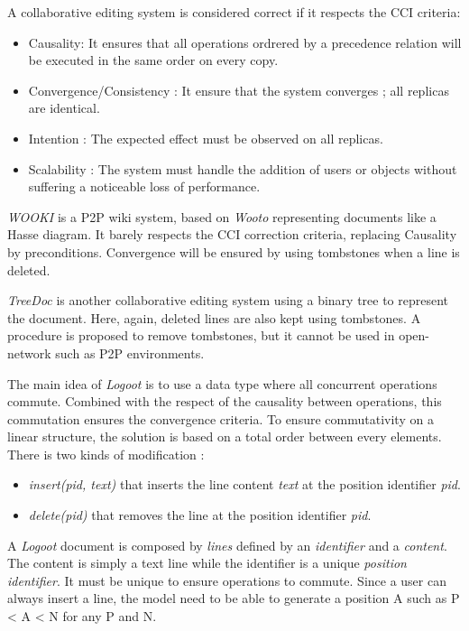 \documentclass[11pt, a4paper]{article}
\begin{document}
 A collaborative editing system is considered correct if it respects the CCI criteria:
 \begin{itemize}
  \item Causality: It ensures that all operations ordrered by a precedence relation will be executed in the same order on every copy.
  \item Convergence/Consistency : It ensure that the system converges ; all replicas are identical.
  \item Intention : The expected effect must be observed on all replicas.
  \item Scalability : The system must handle the addition of users or objects without suffering a noticeable loss of performance.
 \end{itemize}

 \emph{WOOKI} is a P2P wiki system, based on \emph{Wooto} representing documents like a Hasse diagram. It barely respects the CCI correction criteria, replacing Causality by preconditions. Convergence will be ensured by using tombstones when a line is deleted.

 \emph{TreeDoc} is another collaborative editing system using a binary tree to represent the document. Here, again, deleted lines are also kept using tombstones. A procedure is proposed to remove tombstones, but it cannot be used in open-network such as P2P environments.

 The main idea of \emph{Logoot} is to use a data type where all concurrent operations commute. Combined with the respect of the causality between operations, this commutation ensures the convergence criteria. To ensure commutativity on a linear structure, the solution is based on a total order between every elements. There is two kinds of modification :
 \begin{itemize}
  \item \emph{insert(pid, text)} that inserts the line content \emph{text} at the position identifier \emph{pid}.
  \item \emph{delete(pid)} that removes the line at the position identifier \emph{pid}. 
 \end{itemize}

 A \emph{Logoot} document is composed by \emph{lines} defined by an \emph{identifier} and a \emph{content}. The content is simply a text line while the identifier is a unique \emph{position identifier}. It must be unique to ensure operations to commute. Since a user can always insert a line, the model need to be able to generate a position A such as P < A < N for any P and N.
\end{document}

